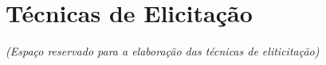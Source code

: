 \section{Técnicas de Elicitação}
	\textit{(Espaço reservado para a elaboração das técnicas de eliticitação)}